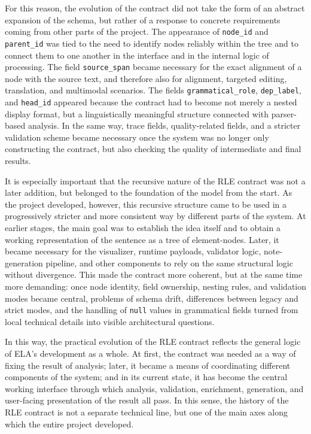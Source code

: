 \documentclass[12pt,a4paper,oneside]{report}
\begin{document}
For this reason, the evolution of the contract did not take the form of an abstract expansion of the schema, but rather of a response to concrete requirements coming from other parts of the project. The appearance of \texttt{node\_id} and \texttt{parent\_id} was tied to the need to identify nodes reliably within the tree and to connect them to one another in the interface and in the internal logic of processing. The field \texttt{source\_span} became necessary for the exact alignment of a node with the source text, and therefore also for alignment, targeted editing, translation, and multimodal scenarios. The fields \texttt{grammatical\_role}, \texttt{dep\_label}, and \texttt{head\_id} appeared because the contract had to become not merely a nested display format, but a linguistically meaningful structure connected with parser-based analysis. In the same way, trace fields, quality-related fields, and a stricter validation scheme became necessary once the system was no longer only constructing the contract, but also checking the quality of intermediate and final results.

It is especially important that the recursive nature of the RLE contract was not a later addition, but belonged to the foundation of the model from the start. As the project developed, however, this recursive structure came to be used in a progressively stricter and more consistent way by different parts of the system. At earlier stages, the main goal was to establish the idea itself and to obtain a working representation of the sentence as a tree of element-nodes. Later, it became necessary for the visualizer, runtime payloads, validator logic, note-generation pipeline, and other components to rely on the same structural logic without divergence. This made the contract more coherent, but at the same time more demanding: once node identity, field ownership, nesting rules, and validation modes became central, problems of schema drift, differences between legacy and strict modes, and the handling of \texttt{null} values in grammatical fields turned from local technical details into visible architectural questions.

In this way, the practical evolution of the RLE contract reflects the general logic of ELA's development as a whole. At first, the contract was needed as a way of fixing the result of analysis; later, it became a means of coordinating different components of the system; and in its current state, it has become the central working interface through which analysis, validation, enrichment, generation, and user-facing presentation of the result all pass. In this sense, the history of the RLE contract is not a separate technical line, but one of the main axes along which the entire project developed.
\end{document}
